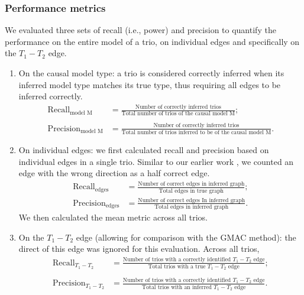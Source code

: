 \documentclass[12pt,letterpaper]{report}
\begin{document}
\begin{doublespace}
\subsubsection{Performance metrics}

We evaluated three sets of recall (i.e., power) and precision to quantify the performance on the entire model of a trio, on individual edges and specifically on the $T_1-T_2$ edge.  %

\begin{enumerate}
  \item On the causal model type:  a trio is considered correctly inferred when its inferred model type matches its true type, thus requiring all edges to be inferred correctly.
\begin{align}
	\text{Recall}_\text{model M} &= \frac{\text{Number of correctly inferred trios}}{\text{Total number of trios of the causal model M}}; \label{eq:rec_total}\\
	\nonumber \\
	\text{Precision}_\text{model M} &= \frac{\text{Number of correctly inferred trios}}{\text{Total number of trios inferred to be of the causal model M}}. \label{eq:prec_total}
\end{align}
  \item On individual edges: we first calculated recall and precision based on individual edges in a single trio.  Similar to our earlier work \cite{badsha2019learning}, we counted an edge with the wrong direction as a half correct edge.  
\begin{align}
	\text{Recall}_\text{edges} &= \frac{\text{Number of correct edges in inferred graph}}{\text{Total edges in true graph}}; \label{eq:rec_edges}\\
	\text{Precision}_\text{edges} &= \frac{\text{Number of correct edges In inferred graph}}{\text{Total edges in inferred graph}}.\label{eq:prec_edges}
\end{align}
We then calculated the mean metric across all trios.
  \item On the $T_1 - T_2$ edge (allowing for comparison with the GMAC method): the direct of this edge was ignored for this evaluation.  Across all trios,
\begin{align}
	\text{Recall}_\text{$T_1 - T_2$} &= \frac{\text{Number of trios with a correctly identified $T_1 - T_2$ edge}}{\text{Total trios with a true $T_1 - T_2$ edge}}; \label{eq:rec_tedge}\\
	\nonumber \\ 
	\text{Precision}_\text{$T_1 - T_2$} &= \frac{\text{Number of trios with a correctly identified $T_1 - T_2$ edge}}{\text{Total trios with an inferred $T_1 - T_2$ edge}}. \label{eq:prec_tedge}
\end{align}
\end{enumerate}



\end{doublespace}
\end{document}
